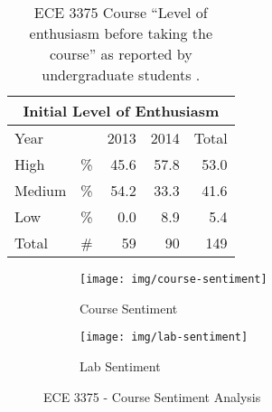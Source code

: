 \begin{table}[hb!]
    \centering
    \begin{tabular}{lc|r|r|r}
        \multicolumn{5}{c}{Initial Level of Enthusiasm} \\ \hline\hline
        \multicolumn{2}{l}{Year} & \multicolumn{1}{|c}{2013} & \multicolumn{1}{|c}{2014} & \multicolumn{1}{|c}{Total} \\ \hline
        High          & \%       & 45.6                     & 57.8                     & 53.0                      \\ 
        Medium        & \%       & 54.2                     & 33.3                     & 41.6                      \\
        Low           & \%       & 0.0                      & 8.9                      & 5.4                       \\ 
        Total         & \#       & 59                       & 90                       & 149                       \\ \hline
    \end{tabular}
    \caption{ECE 3375 Course ``Level of enthusiasm before taking the course'' as reported by undergraduate students \cite{evals:ece3375-2013, evals:ece3375-2014}.} 
    \label{table-course-enthusiasm-ece3375}
\end{table}


\begin{figure}
    \centering
    \begin{subfigure}{.8\linewidth}
        \centering
        \texttt{[image: img/course-sentiment]}
        \caption{Course Sentiment}
        \label{fig:ece-3375-course-sentiment}
    \end{subfigure}
    
    \begin{subfigure}{.8\linewidth}
        \centering
        \texttt{[image: img/lab-sentiment]}
        \caption{Lab Sentiment}
        \label{fig:ece-3375-lab-sentiment}
    \end{subfigure}
    
    \caption{ECE 3375 - Course Sentiment Analysis\cite{evals:ece3375-2013, evals:ece3375-2014}}
\end{figure}

